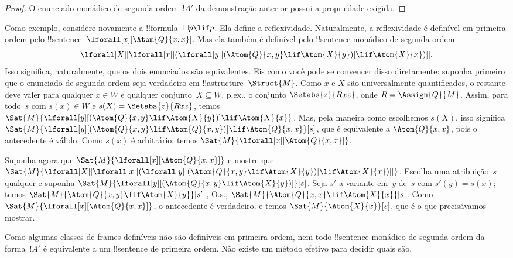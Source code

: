 \documentclass[../../../include/open-logic-section]{subfiles}
\begin{document}
\begin{proof}
  O enunciado monádico de segunda ordem~$!A'$ da demonstração anterior possui
  a propriedade exigida.
\end{proof}

Como exemplo, considere novamente a !!{formula}~$\Box p \lif p$. Ela define a
reflexividade. Naturalmente, a reflexividade é definível em primeira ordem
pelo !!{sentence}~$\lforall[x][\Atom{Q}{x,x}]$. Mas ela também é definível
pelo !!{sentence} monádico de segunda ordem
\[
\lforall[X][\lforall[x][(\lforall[y][(\Atom{Q}{x,y} \lif \Atom{X}{y})]
    \lif \Atom{X}{x})]].
\]
Isso significa, naturalmente, que os dois enunciados são equivalentes. Eis
como você pode se convencer disso diretamente: suponha primeiro que o
enunciado de segunda ordem seja verdadeiro em !!a{structure}~$\Struct{M}$.
Como $x$ e $X$ são universalmente quantificados, o restante deve valer para
qualquer $x \in W$ e qualquer conjunto~$X \subseteq W$, p.ex., o
conjunto $\Setabs{z}{Rxz}$, onde $R = \Assign{Q}{M}$. Assim, para todo~$s$ com
$s(x) \in W$ e $s(X) = \Setabs{z}{Rxz}$, temos
$\Sat{M}{\lforall[y][(\Atom{Q}{x,y} \lif \Atom{X}{y})] \lif
    \Atom{X}{x}}$. Mas, pela maneira como escolhemos $s(X)$, isso significa
$\Sat{M}{\lforall[y][(\Atom{Q}{x,y} \lif \Atom{Q}{x,y})] \lif
    \Atom{Q}{x,x}}[s]$, que é equivalente a $\Atom{Q}{x,x}$, pois o
antecedente é válido. Como $s(x)$ é arbitrário, temos
$\Sat{M}{\lforall[x][\Atom{Q}{x,x}]}$.

Suponha agora que $\Sat{M}{\lforall[x][\Atom{Q}{x,x}]}$ e mostre que
$\Sat{M}{\lforall[X][\lforall[x][(\lforall[y][(\Atom{Q}{x,y} \lif
        \Atom{X}{y})] \lif \Atom{X}{x})]]}$. Escolha uma atribuição~$s$
qualquer e suponha $\Sat{M}{\lforall[y][(\Atom{Q}{x,y} \lif
    \Atom{X}{y})]}[s]$. Seja $s'$ a variante em~$y$ de~$s$ com
$s'(y) = s(x)$; temos $\Sat{M}{\Atom{Q}{x,y} \lif \Atom{X}{y}}[s']$, O.s.\@,
$\Sat{M}{\Atom{Q}{x,x} \lif \Atom{X}{x}}[s]$. Como
$\Sat{M}{\lforall[x][\Atom{Q}{x,x}]}$, o antecedente é verdadeiro, e temos
$\Sat{M}{\Atom{X}{x}}[s]$, que é o que precisávamos mostrar.

Como algumas classes de frames definíveis não são definíveis em primeira
ordem, nem todo !!{sentence} monádico de segunda ordem da forma~$!A'$ é
equivalente a um !!{sentence} de primeira ordem. Não existe um método efetivo
para decidir quais são.
\end{document}
